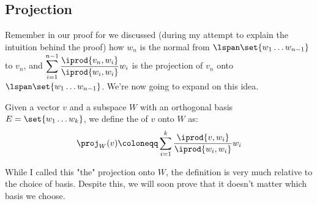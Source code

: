 \documentclass[10pt]{article}
\begin{document}
\newpage
\subsection{Projection}

Remember in our proof for  we discussed (during my attempt to explain the intuition behind the proof) how $w_n$ is the normal from $\lspan\set{w_1\dots w_{n-1}}$ to $v_n$, and $\displaystyle\sum_{i=1}^{n-1}\dfrac{\iprod{v_n,w_i}}{\iprod{w_i,w_i}}w_i$ is the projection of $v_n$ onto $\lspan\set{w_1\dots w_{n-1}}$. We're now going to expand on this idea.

\begin{definition*}

Given a vector $v$ and a subspace $W$ with an orthogonal basis $E=\set{w_1\dots w_k}$, we define the  of $v$ onto $W$ as:
\[ \proj_W(v)\coloneqq\sum_{i=1}^k\dfrac{\iprod{v,w_i}}{\iprod{w_i,w_i}}w_i \]

\end{definition*}

\begin{note}

While I called this "the" projection onto $W$, the definition is very much relative to the choice of basis. Despite this, we will soon prove that it doesn't matter which basis we choose.

\end{note}
\end{document}

